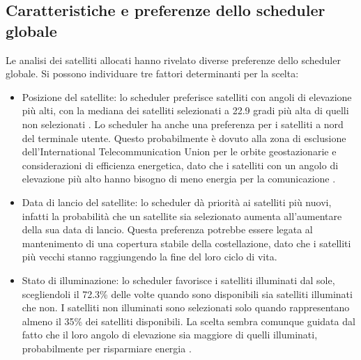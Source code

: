 \subsection{Caratteristiche e preferenze dello scheduler globale}
Le analisi dei satelliti allocati hanno rivelato diverse preferenze dello scheduler globale. Si possono individuare tre fattori determinanti per la scelta:
\begin{itemize}
  \item Posizione del satellite: lo scheduler preferisce satelliti con angoli di elevazione più alti, con la mediana dei satelliti selezionati a 22.9 gradi più alta di quelli non selezionati \cite{tanveer_making_2023}.
  Lo scheduler ha anche una preferenza per i satelliti a nord del terminale utente. Questo probabilmente è dovuto alla zona di esclusione dell'International Telecommunication Union per le orbite geostazionarie e considerazioni di efficienza energetica, dato che i satelliti con un angolo di elevazione più alto hanno bisogno di meno energia per la comunicazione \cite{tanveer_making_2023}.
  \item Data di lancio del satellite: lo scheduler dà priorità ai satelliti più nuovi, infatti la probabilità che un satellite sia selezionato aumenta all'aumentare della sua data di lancio. Questa preferenza potrebbe essere legata al mantenimento di una copertura stabile della costellazione, dato che i satelliti più vecchi stanno raggiungendo la fine del loro ciclo di vita.
  \item Stato di illuminazione: lo scheduler favorisce i satelliti illuminati dal sole, scegliendoli il 72.3\% delle volte quando sono disponibili sia satelliti illuminati che non. I satelliti non illuminati sono selezionati solo quando rappresentano almeno il 35\% dei satelliti disponibili. La scelta sembra comunque guidata dal fatto che il loro angolo di elevazione sia maggiore di quelli illuminati, probabilmente per risparmiare energia \cite{tanveer_making_2023}.
\end{itemize}

